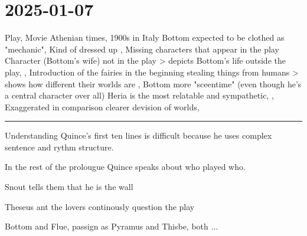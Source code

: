 \section{2025-01-07}

\startplacetable[location={here},title={Differences between the movie and the written play}]
\setupTABLE[r][1][background=color,backgroundcolor=gray]
\bTABLE[offset=1mm]
\startCSV
Play,                                                                               Movie
Athenian times,                                                                     1900s in Italy
Bottom expected to be clothed as "mechanic",                                        Kind of dressed up
,                                                                                   Missing characters that appear in the play
Character (Bottom's wife) not in the play > depicts Bottom's life outside the play,
,                                                                                   Introduction of the fairies in the beginning stealing things from humans > shows how different their worlds are
,                                                                                   Bottom more "sceentime" (even though he's a central character over all)
Heria is the most relatable and sympathetic,
,                                                                                   Exaggerated in comparison
clearer devision of worlds,
\stopCSV
\eTABLE
\stopplacetable


\blank
\hrule
\blank


\startitemize[packed,a]
\item Understanding Quince's first ten lines is difficult because he uses complex sentence and rythm structure.
\item In the rest of the prolougue Quince speaks about who played who.
\item Snout tells them that he is the wall
\item
\item 
\item Theseus ant the lovers continously question the play 
\item Bottom and Flue, passign as Pyramus and Thisbe, both ...
\stopitemize


